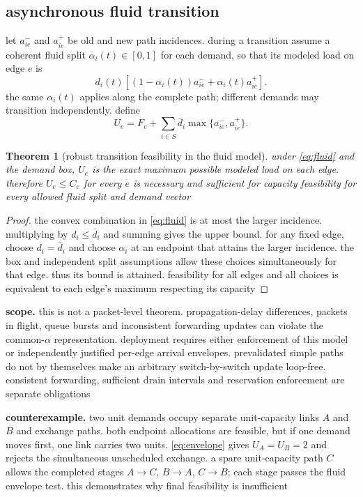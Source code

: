 \documentclass[11pt,a4paper]{article}
\newtheorem{theorem}{Theorem}
\newcommand{\1}{\mathbf{1}}
\begin{document}
\subsection{asynchronous fluid transition}
let $a^-_{ie}$ and $a^+_{ie}$ be old and new path incidences. during a transition assume a coherent fluid split $\alpha_i(t)\in[0,1]$ for each demand, so that its modeled load on edge $e$ is
\begin{equation}
 d_i(t)\left[(1-\alpha_i(t))a^-_{ie}+\alpha_i(t)a^+_{ie}\right].\label{eq:fluid}
\end{equation}
the same $\alpha_i(t)$ applies along the complete path; different demands may transition independently. define
\begin{equation}
 U_e=F_e+\sum_{i\in S}\bar d_i\max\{a^-_{ie},a^+_{ie}\}.\label{eq:envelope}
\end{equation}
\begin{theorem}[robust transition feasibility in the fluid model]\label{thm:transition}
under \eqref{eq:fluid} and the demand box, $U_e$ is the exact maximum possible modeled load on each edge. therefore $U_e\le C_e$ for every $e$ is necessary and sufficient for capacity feasibility for every allowed fluid split and demand vector
\end{theorem}
\begin{proof}
the convex combination in \eqref{eq:fluid} is at most the larger incidence. multiplying by $d_i\le\bar d_i$ and summing gives the upper bound. for any fixed edge, choose $d_i=\bar d_i$ and choose $\alpha_i$ at an endpoint that attains the larger incidence. the box and independent split assumptions allow these choices simultaneously for that edge. thus its bound is attained. feasibility for all edges and all choices is equivalent to each edge's maximum respecting its capacity
\end{proof}
\textbf{scope.} this is not a packet-level theorem. propagation-delay differences, packets in flight, queue bursts and inconsistent forwarding updates can violate the common-$\alpha$ representation. deployment requires either enforcement of this model or independently justified per-edge arrival envelopes. prevalidated simple paths do not by themselves make an arbitrary switch-by-switch update loop-free. consistent forwarding, sufficient drain intervals and reservation enforcement are separate obligations

\textbf{counterexample.} two unit demands occupy separate unit-capacity links $A$ and $B$ and exchange paths. both endpoint allocations are feasible, but if one demand moves first, one link carries two units. \eqref{eq:envelope} gives $U_A=U_B=2$ and rejects the simultaneous unscheduled exchange. a spare unit-capacity path $C$ allows the completed stages $A\to C$, $B\to A$, $C\to B$; each stage passes the fluid envelope test. this demonstrates why final feasibility is insufficient
\end{document}
